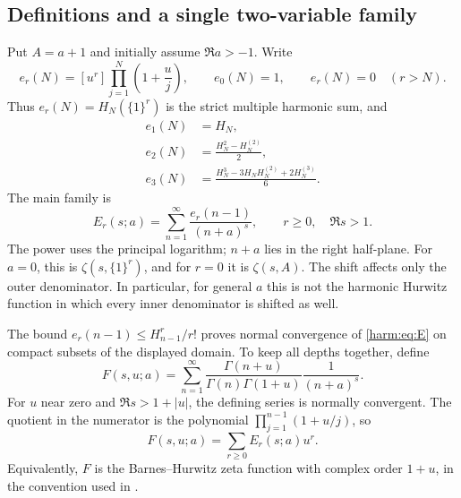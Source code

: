 \documentclass[11pt,letterpaper]{article}
\numberwithin{equation}{section}
\theoremstyle{plain}
\theoremstyle{definition}
\theoremstyle{remark}
\begin{document}
\subsection{Definitions and a single two-variable family}

Put $A=a+1$ and initially assume $\Re a>-1$.  Write
\begin{equation}\label{harm:eq:elementary}
 e_r(N)=[u^r]\prod_{j=1}^{N}\left(1+\frac uj\right),
 \qquad e_0(N)=1,
 \qquad e_r(N)=0\quad(r>N).
\end{equation}
Thus $e_r(N)=H_N(\{1\}^r)$ is the strict multiple harmonic sum, and
\begin{align*}
 e_1(N)&=H_N,\\
 e_2(N)&=\frac{H_N^2-H_N^{(2)}}2,\\
 e_3(N)&=\frac{H_N^3-3H_NH_N^{(2)}+2H_N^{(3)}}6.
\end{align*}
The main family is
\begin{equation}\label{harm:eq:E}
 E_r(s;a)=\sum_{n=1}^{\infty}\frac{e_r(n-1)}{(n+a)^s},
 \qquad r\geq0,\quad \Re s>1.
\end{equation}
The power uses the principal logarithm; $n+a$ lies in the right half-plane.
For $a=0$, this is $\zeta(s,\{1\}^r)$, and for $r=0$ it is
$\zeta(s,A)$.  The shift affects only the outer denominator.  In
particular, for general $a$ this is not the harmonic Hurwitz function
in which every inner denominator is shifted as well.

The bound $e_r(n-1)\leq H_{n-1}^r/r!$ proves normal convergence of
\eqref{harm:eq:E} on compact subsets of the displayed domain.  To keep
all depths together, define
\begin{equation}\label{harm:eq:F}
 F(s,u;a)=\sum_{n=1}^{\infty}
 \frac{\Gamma(n+u)}{\Gamma(n)\Gamma(1+u)}\frac1{(n+a)^s}.
\end{equation}
For $u$ near zero and $\Re s>1+|u|$, the defining series is normally
convergent.  The quotient in the numerator is the polynomial
$\prod_{j=1}^{n-1}(1+u/j)$, so
\begin{equation}\label{harm:eq:coeff}
 F(s,u;a)=\sum_{r\geq0}E_r(s;a)u^r.
\end{equation}
Equivalently, $F$ is the Barnes--Hurwitz zeta function with complex
order $1+u$, in the convention used in \cite{Young2024}.
\end{document}
